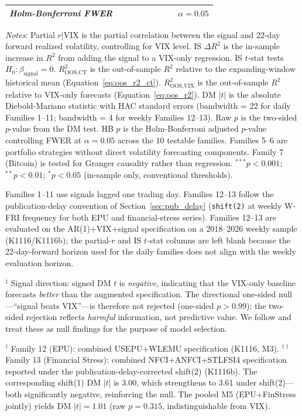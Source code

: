\documentclass[12pt,a4paper]{article}
\begin{document}
\begin{table}[H]
\begin{threeparttable}
{\begin{tabular}{@{}clcccccccc@{}}
\multicolumn{2}{l}{\textit{Holm-Bonferroni FWER}} & & & & & & & & $\alpha = 0.05$ \\
\bottomrule
\end{tabular}%
}
\begin{tablenotes}
\small
\item \textit{Notes}: Partial $r|\text{VIX}$ is the partial correlation between the signal and 22-day forward realized volatility, controlling for VIX level. IS $\Delta R^2$ is the in-sample increase in $R^2$ from adding the signal to a VIX-only regression. IS $t$-stat tests $H_0: \beta_{\text{signal}} = 0$. $R^2_{\text{OOS,CT}}$ is the \citet{campbell2008} out-of-sample $R^2$ relative to the expanding-window historical mean (Equation~\ref{eq:oos_r2_ct}). $R^2_{\text{OOS,VIX}}$ is the out-of-sample $R^2$ relative to VIX-only forecasts (Equation~\ref{eq:oos_r2}). DM $|t|$ is the absolute Diebold-Mariano statistic with \citet{newey1987} HAC standard errors (bandwidth = 22 for daily Families 1--11; bandwidth = 4 for weekly Families 12--13). Raw $p$ is the two-sided $p$-value from the DM test. HB $p$ is the Holm-Bonferroni adjusted $p$-value controlling FWER at $\alpha = 0.05$ across the 10 testable families. Families 5--6 are portfolio strategies without direct volatility forecasting components. Family 7 (Bitcoin) is tested for Granger causality rather than regression. $^{***}p<0.001$; $^{**}p<0.01$; $^{*}p<0.05$ (in-sample only, conventional thresholds).
\item Families 1--11 use signals lagged one trading day. Families 12--13 follow the publication-delay convention of Section~\ref{sec:pub_delay} (\texttt{shift(2)} at weekly W-FRI frequency for both EPU and financial-stress series). Families 12--13 are evaluated on the AR(1)+VIX+signal specification on a 2018--2026 weekly sample (K1116/K1116b); the partial-$r$ and IS $t$-stat columns are left blank because the 22-day-forward horizon used for the daily families does not align with the weekly evaluation horizon.
\item $^{\ddagger}$ Signal direction: signed DM $t$ is \emph{negative}, indicating that the VIX-only baseline forecasts \emph{better} than the augmented specification. The directional one-sided null---``signal beats VIX''---is therefore not rejected (one-sided $p>0.99$); the two-sided rejection reflects \emph{harmful} information, not predictive value. We follow \citet{harvey2016} and treat these as null findings for the purpose of model selection.
\item $^{\dagger}$ Family 12 (EPU): combined USEPU+WLEMU specification (K1116, M3). $^{\dagger\dagger}$ Family 13 (Financial Stress): combined NFCI+ANFCI+STLFSI4 specification reported under the publication-delay-corrected shift(2) (K1116b). The corresponding shift(1) DM $|t|$ is 3.00, which strengthens to 3.61 under shift(2)---both significantly negative, reinforcing the null. The pooled M5 (EPU+FinStress jointly) yields DM $|t|=1.01$ (raw $p=0.315$, indistinguishable from VIX).

\end{tablenotes}
\end{threeparttable}
\end{table}
\end{document}
